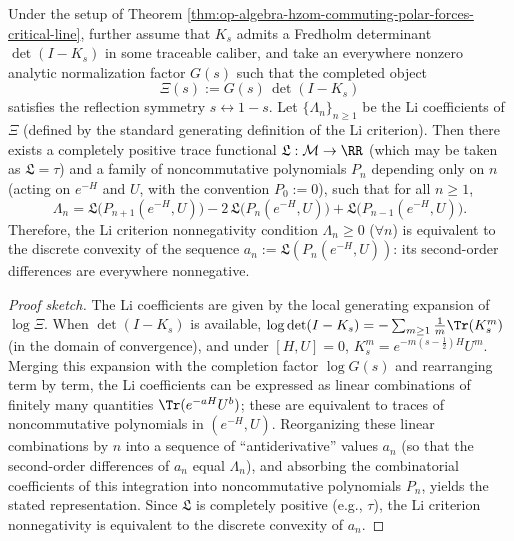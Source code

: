 \begin{proposition}\label{prop:op-algebra-li-criterion-operatorized}
Under the setup of Theorem \ref{thm:op-algebra-hzom-commuting-polar-forces-critical-line},
further assume that \(K_s\) admits a Fredholm determinant \(\det(I-K_s)\) in some traceable caliber, and take an everywhere nonzero analytic normalization factor \(G(s)\) such that the completed object
\[
\Xi(s):=G(s)\,\det(I-K_s)
\]
satisfies the reflection symmetry \(s\leftrightarrow 1-s\).
Let \(\{\Lambda_n\}_{n\ge 1}\) be the Li coefficients of \(\Xi\) (defined by the standard generating definition of the Li criterion).
Then there exists a completely positive trace functional \(\mathfrak{L}:\mathcal{M}\to\RR\) (which may be taken as \(\mathfrak{L}=\tau\)) and a family of noncommutative polynomials \(P_n\) depending only on \(n\) (acting on \(e^{-H}\) and \(U\), with the convention \(P_0:=0\)), such that for all \(n\ge 1\),
\[
\boxed{\;
\Lambda_n
=\mathfrak{L}\!\bigl(P_{n+1}(e^{-H},U)\bigr)
-2\,\mathfrak{L}\!\bigl(P_{n}(e^{-H},U)\bigr)
+\mathfrak{L}\!\bigl(P_{n-1}(e^{-H},U)\bigr).\;}
\]
Therefore, the Li criterion nonnegativity condition \(\Lambda_n\ge 0\) (\(\forall n\)) is equivalent to the discrete convexity of the sequence
\(
a_n:=\mathfrak{L}(P_n(e^{-H},U))
\):
its second-order differences are everywhere nonnegative.
\end{proposition}
\begin{proof}[Proof sketch]
The Li coefficients are given by the local generating expansion of \(\log \Xi\).
When \(\det(I-K_s)\) is available,
\(
\log\det(I-K_s)=-\sum_{m\ge 1}\frac{1}{m}\Tr(K_s^m)
\)
(in the domain of convergence), and under \([H,U]=0\), \(K_s^m=e^{-m(s-\tfrac12)H}U^m\).
Merging this expansion with the completion factor \(\log G(s)\) and rearranging term by term, the Li coefficients can be expressed as linear combinations of finitely many quantities \(\Tr(e^{-aH}U^b)\);
these are equivalent to traces of noncommutative polynomials in \((e^{-H},U)\).
Reorganizing these linear combinations by \(n\) into a sequence of ``antiderivative'' values \(a_n\) (so that the second-order differences of \(a_n\) equal \(\Lambda_n\)), and absorbing the combinatorial coefficients of this integration into noncommutative polynomials \(P_n\), yields the stated representation.
Since \(\mathfrak{L}\) is completely positive (e.g., \(\tau\)), the Li criterion nonnegativity is equivalent to the discrete convexity of \(a_n\). \qedhere
\end{proof}

